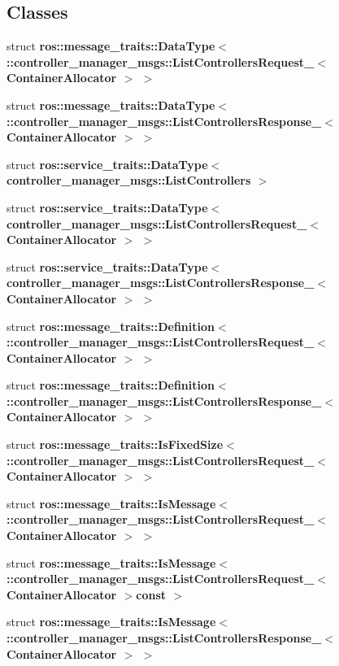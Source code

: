 \subsection*{\-Classes}
\begin{DoxyCompactItemize}
\item 
struct {\bf ros\-::message\-\_\-traits\-::\-Data\-Type$<$ \-::controller\-\_\-manager\-\_\-msgs\-::\-List\-Controllers\-Request\-\_\-$<$ Container\-Allocator $>$ $>$}
\item 
struct {\bf ros\-::message\-\_\-traits\-::\-Data\-Type$<$ \-::controller\-\_\-manager\-\_\-msgs\-::\-List\-Controllers\-Response\-\_\-$<$ Container\-Allocator $>$ $>$}
\item 
struct {\bf ros\-::service\-\_\-traits\-::\-Data\-Type$<$ controller\-\_\-manager\-\_\-msgs\-::\-List\-Controllers $>$}
\item 
struct {\bf ros\-::service\-\_\-traits\-::\-Data\-Type$<$ controller\-\_\-manager\-\_\-msgs\-::\-List\-Controllers\-Request\-\_\-$<$ Container\-Allocator $>$ $>$}
\item 
struct {\bf ros\-::service\-\_\-traits\-::\-Data\-Type$<$ controller\-\_\-manager\-\_\-msgs\-::\-List\-Controllers\-Response\-\_\-$<$ Container\-Allocator $>$ $>$}
\item 
struct {\bf ros\-::message\-\_\-traits\-::\-Definition$<$ \-::controller\-\_\-manager\-\_\-msgs\-::\-List\-Controllers\-Request\-\_\-$<$ Container\-Allocator $>$ $>$}
\item 
struct {\bf ros\-::message\-\_\-traits\-::\-Definition$<$ \-::controller\-\_\-manager\-\_\-msgs\-::\-List\-Controllers\-Response\-\_\-$<$ Container\-Allocator $>$ $>$}
\item 
struct {\bf ros\-::message\-\_\-traits\-::\-Is\-Fixed\-Size$<$ \-::controller\-\_\-manager\-\_\-msgs\-::\-List\-Controllers\-Request\-\_\-$<$ Container\-Allocator $>$ $>$}
\item 
struct {\bf ros\-::message\-\_\-traits\-::\-Is\-Message$<$ \-::controller\-\_\-manager\-\_\-msgs\-::\-List\-Controllers\-Request\-\_\-$<$ Container\-Allocator $>$ $>$}
\item 
struct {\bf ros\-::message\-\_\-traits\-::\-Is\-Message$<$ \-::controller\-\_\-manager\-\_\-msgs\-::\-List\-Controllers\-Request\-\_\-$<$ Container\-Allocator $>$const  $>$}
\item 
struct {\bf ros\-::message\-\_\-traits\-::\-Is\-Message$<$ \-::controller\-\_\-manager\-\_\-msgs\-::\-List\-Controllers\-Response\-\_\-$<$ Container\-Allocator $>$ $>$}
\item 

\end{DoxyCompactItemize}
